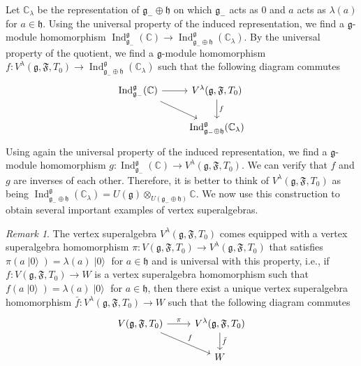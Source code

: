 \documentclass[a4paper, 12pt, reqno]{amsart}
\theoremstyle{remark}
\newtheorem{remark}[theorem]{Remark}
\numberwithin{equation}{subsection}
\DeclareMathOperator{\Ind}{Ind}
\DeclareMathOperator{\vac}{|0\rangle}
\begin{document}
Let $\mathbb{C}_{\lambda}$ be the representation of $\mathfrak{g}_- \oplus \mathfrak{h}$ on which $\mathfrak{g}_-$ acts as $0$ and $a$ acts as $\lambda(a)$ for $a \in \mathfrak{h}$.
Using the universal property of the induced representation, we find a $\mathfrak{g}$-module homomorphism $\Ind^{\mathfrak{g}}_{\mathfrak{g}_-}(\mathbb{C}) \to \Ind^{\mathfrak{g}}_{\mathfrak{g}_- \oplus \mathfrak{h}}(\mathbb{C}_{\lambda})$.
By the universal property of the quotient, we find a $\mathfrak{g}$-module homomorphism $f: V^{\lambda}(\mathfrak{g}, \mathfrak{F}, T_0) \to \Ind^{\mathfrak{g}}_{\mathfrak{g}_- \oplus \mathfrak{h}}(\mathbb{C}_{\lambda})$ such that the following diagram commutes
\begin{equation*}
  \begin{tikzcd}
    {\Ind^{\mathfrak{g}}_{\mathfrak{g}_-}(\mathbb{C})} \arrow[rd] \arrow[r] & {V^{\lambda}(\mathfrak{g}, \mathfrak{F}, T_0)} \arrow[d, "f"] \\
    & \Ind^{\mathfrak{g}}_{\mathfrak{g}_- \oplus \mathfrak{h}}(\mathbb{C}_{\lambda})
  \end{tikzcd}
\end{equation*}
Using again the universal property of the induced representation, we find a $\mathfrak{g}$-module homomorphism $g: \Ind^{\mathfrak{g}}_{\mathfrak{g}_-}(\mathbb{C}) \to V^{\lambda}(\mathfrak{g}, \mathfrak{F}, T_0)$.
We can verify that $f$ and $g$ are inverses of each other.
Therefore, it is better to think of $V^{\lambda}(\mathfrak{g}, \mathfrak{F}, T_0)$ as being $\Ind^{\mathfrak{g}}_{\mathfrak{g}_- \oplus \mathfrak{h}}(\mathbb{C}_{\lambda}) = U(\mathfrak{g}) \otimes_{U(\mathfrak{g}_- \oplus \mathfrak{h})} \mathbb{C}$.
We now use this construction to obtain several important examples of vertex superalgebras.

\begin{remark}
  \label{rmk:16}
  The vertex superalgebra $V^{\lambda}(\mathfrak{g}, \mathfrak{F}, T_0)$ comes equipped with a vertex superalgebra homomorphism $\pi: V(\mathfrak{g}, \mathfrak{F}, T_0) \to V^{\lambda}(\mathfrak{g}, \mathfrak{F}, T_0)$ that satisfies $\pi(a\vac) = \lambda(a)\vac$ for $a \in \mathfrak{h}$ and is universal with this property, i.e., if $f: V(\mathfrak{g}, \mathfrak{F}, T_0) \to W$ is a vertex superalgebra homomorphism such that $f(a\vac) = \lambda(a)\vac$ for $a \in \mathfrak{h}$, then there exist a unique vertex superalgebra homomorphism $\bar{f}: V^{\lambda}(\mathfrak{g}, \mathfrak{F}, T_0) \to W$ such that the following diagram commutes
  \begin{equation*}
    \begin{tikzcd}
      {V(\mathfrak{g}, \mathfrak{F}, T_0)} \arrow[rd, "f"] \arrow[r, "\pi"] & {V^{\lambda}(\mathfrak{g}, \mathfrak{F}, T_0)} \arrow[d, "\bar{f}"] \\
      & W
    \end{tikzcd}
  \end{equation*}
\end{remark}
\end{document}
